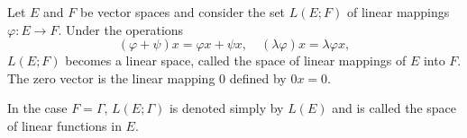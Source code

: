 Let $E$ and $F$ be vector spaces and consider the set $L(E; F)$ of linear mappings $\varphi: E \to F$. Under the operations
$$(\varphi + \psi)x = \varphi x + \psi x, \quad (\lambda \varphi)x = \lambda \varphi x,$$
$L(E; F)$ becomes a linear space, called the space of linear mappings of $E$ into $F$. The zero vector is the linear mapping $0$ defined by $0x = 0$.

In the case $F = \Gamma$, $L(E; \Gamma)$ is denoted simply by $L(E)$ and is called the space of linear functions in $E$.
